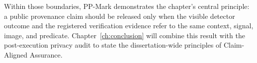 Within those boundaries, PP-Mark demonstrates the chapter's central principle: a
public provenance claim should be released only when the visible detector outcome
and the registered verification evidence refer to the same context, signal,
image, and predicate.  Chapter~\ref{ch:conclusion} will combine this result with
the post-execution privacy audit to state the dissertation-wide principles of
Claim-Aligned Assurance.
